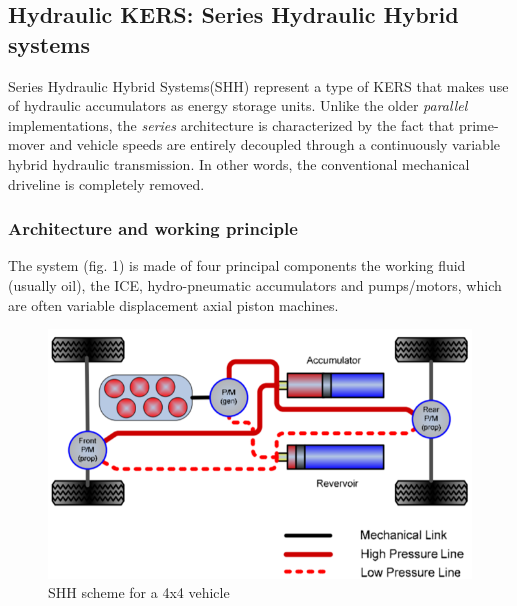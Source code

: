\documentclass[11pt]{article}
\begin{document}
\subsection{Hydraulic KERS: Series Hydraulic Hybrid systems}

Series Hydraulic Hybrid Systems(SHH) represent a type of KERS that makes use of hydraulic accumulators as energy storage units. Unlike the older \textit{parallel} implementations, the \textit{series} architecture is characterized by the fact that prime-mover and vehicle speeds are entirely decoupled through a continuously variable hybrid hydraulic transmission. In other words, the conventional mechanical driveline is completely removed.

\subsubsection{Architecture and working principle}

The system (fig. 1) is made of four principal components \cite{d} the working fluid (usually oil), the ICE, hydro-pneumatic accumulators and pumps/motors, which are often variable displacement axial piston machines.

\begin{figure}[H]
\centering
\includegraphics[width=.6\textwidth]{Images/Hydraulic KERS.png}
\caption{SHH scheme for a 4x4 vehicle}
\label{StepF1}
\end{figure}
\end{document}
